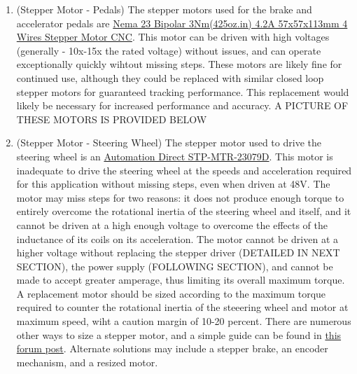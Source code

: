 \documentclass[12pt,oneside,letterpaper]{article}
\begin{document}
\begin{enumerate}
\item(Stepper Motor - Pedals) The stepper motors used for the brake and accelerator pedals are \href{https://www.omc-stepperonline.com/nema-23-bipolar-3nm-425oz-in-4-2a-57x57x114mm-4-wires-stepper-motor-cnc-23hs45-4204s}{Nema 23 Bipolar 3Nm(425oz.in) 4.2A 57x57x113mm 4 Wires Stepper Motor CNC}. This motor can be driven with high voltages (generally - 10x-15x the rated voltage) without issues, and can operate exceptionally quickly wihtout missing steps. These motors are likely fine for continued use, although they could be replaced with similar closed loop stepper motors for guaranteed tracking performance. This replacement would likely be necessary for increased performance and accuracy.
A PICTURE OF THESE MOTORS IS PROVIDED BELOW

\item(Stepper Motor - Steering Wheel) The stepper motor used to drive the steering wheel is an \href{https://www.automationdirect.com/adc/shopping/catalog/motion_control/stepper_systems/dual_shaft_and_encoder_stepper_motors/stp-mtr-23079d}{Automation Direct STP-MTR-23079D}. This motor is inadequate to drive the steering wheel at the speeds and acceleration required for this application without missing steps, even when driven at 48V. The motor may miss steps for two reasons: it does not produce enough torque to entirely overcome the rotational inertia of the steering wheel and itself, and it cannot be driven at a high enough voltage to overcome the effects of the inductance of its coils on its acceleration. The motor cannot be driven at a higher voltage without replacing the stepper driver (DETAILED IN NEXT SECTION), the power supply (FOLLOWING SECTION), and cannot be made to accept greater amperage, thus limiting its overall maximum torque. A replacement motor should be sized according to the maximum torque required to counter the rotational inertia of the steeering wheel and motor at maximum speed, wiht a caution margin of 10-20 percent. There are numerous other ways to size a stepper motor, and a simple guide can be found in \href{https://forum.arduino.cc/t/stepper-motor-basics/275223}{this forum post}. Alternate solutions may include a stepper brake, an encoder mechanism, and a resized motor.


\end{enumerate}
\end{document}
